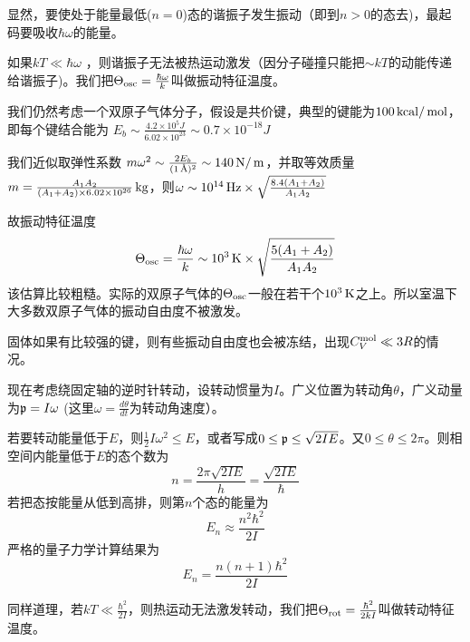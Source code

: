 \documentclass[CJK]{beamer}
\begin{document}
\begin{frame}
\bch
{\small 
显然，要使处于能量最低($n=0$)态的谐振子发生振动（即到$n>0$的态去)，最起码要吸收$\hbar \omega$的能量。

\skipline

如果$kT\ll \hbar\omega$ ，则谐振子无法被热运动激发（因分子碰撞只能把$\sim kT$的动能传递给谐振子)。我们把$\Theta_{\rm osc} = \frac{\hbar\omega}{k}$叫做振动特征温度。
}
\ech
\end{frame}


\begin{frame}
\bch
{\small
我们仍然考虑一个双原子气体分子，假设是共价键，典型的键能为$100\,\mathrm{kcal}/\,\mathrm{mol}$，即每个键结合能为
$E_b\sim \frac{4.2\times 10^5J}{6.02\times 10^{23}} \sim 0.7\times 10^{-18}J$

我们近似取弹性系数
$m\omega^2 \sim  \frac{2E_b}{(1 \,\text{\AA})^2} \sim 140 \,\mathrm{N}/\,\mathrm{m}$，并取等效质量$m = \frac{A_1A_2}{(A_1+A_2)\times 6.02\times 10^{26}} \,\mathrm{kg}$，则$\omega \sim 10^{14}\,\mathrm{Hz} \times \sqrt{\frac{8.4(A_1+A_2)}{A_1A_2}} $

故振动特征温度
$$\Theta_{\rm osc} =\frac{\hbar \omega}{k} \sim 10^3\,\mathrm{K} \times \sqrt{\frac{5(A_1+A_2)}{A_1A_2}} $$
该估算比较粗糙。实际的双原子气体的$\Theta_{\rm osc}$一般在若干个$10^3\,\mathrm{K}$之上。所以{\blue 室温下大多数双原子气体的振动自由度不被激发。}

\skipline

{\blue 固体如果有比较强的键，则有些振动自由度也会被冻结，出现$C^{\rm mol}_V \ll 3R$的情况。}
}
\ech
\end{frame}


\begin{frame}
\bch
现在考虑绕固定轴的逆时针转动，设转动惯量为$I$。广义位置为转动角$\theta$，广义动量为${\mathfrak{p}} = I\omega$ (这里$\omega = \frac{d\theta}{dt}$为转动角速度）。

若要转动能量低于$E$，则$\frac{1}{2}I\omega^2 \le E$，或者写成$0\le {\mathfrak{p}} \le \sqrt{2I E}$。又$0\le \theta \le 2\pi$。则相空间内能量低于$E$的态个数为
$$n = \frac{2\pi \sqrt{2IE}}{h} = \frac{\sqrt{2IE}}{\hbar}$$
若把态按能量从低到高排，则第$n$个态的能量为
$$E_n \approx \frac{n^2\hbar^2}{2I}$$
严格的量子力学计算结果为
$$E_n = \frac{n(n+1)\hbar^2}{2I}$$
\ech
\end{frame}


\begin{frame}
\bch
同样道理，若$kT\ll \frac{\hbar^2}{2I}$，则热运动无法激发转动，我们把$\Theta_{\rm rot} = \frac{\hbar^2}{2kI}$叫做转动特征温度。

\ech
\end{frame}
\end{document}
